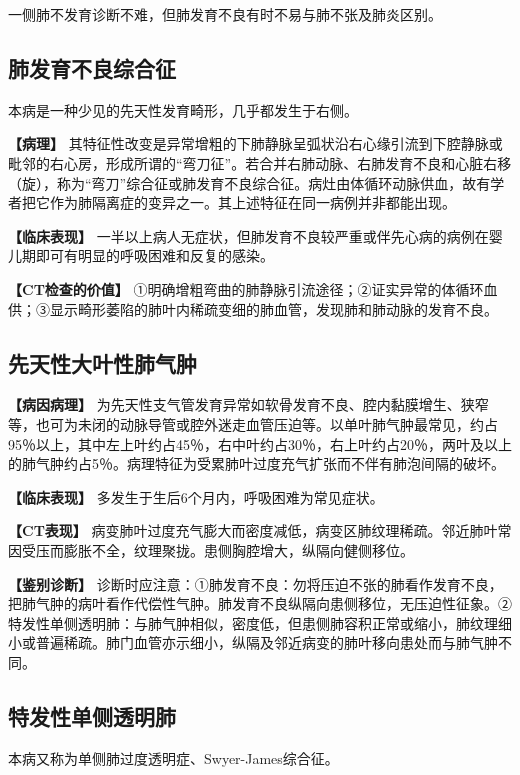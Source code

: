 一侧肺不发育诊断不难，但肺发育不良有时不易与肺不张及肺炎区别。

\subsection{肺发育不良综合征}

本病是一种少见的先天性发育畸形，几乎都发生于右侧。

\textbf{【病理】}
其特征性改变是异常增粗的下肺静脉呈弧状沿右心缘引流到下腔静脉或毗邻的右心房，形成所谓的“弯刀征”。若合并右肺动脉、右肺发育不良和心脏右移（旋），称为“弯刀”综合征或肺发育不良综合征。病灶由体循环动脉供血，故有学者把它作为肺隔离症的变异之一。其上述特征在同一病例并非都能出现。

\textbf{【临床表现】}
一半以上病人无症状，但肺发育不良较严重或伴先心病的病例在婴儿期即可有明显的呼吸困难和反复的感染。

\textbf{【CT检查的价值】}
①明确增粗弯曲的肺静脉引流途径；②证实异常的体循环血供；③显示畸形萎陷的肺叶内稀疏变细的肺血管，发现肺和肺动脉的发育不良。

\subsection{先天性大叶性肺气肿}

\textbf{【病因病理】}
为先天性支气管发育异常如软骨发育不良、腔内黏膜增生、狭窄等，也可为未闭的动脉导管或腔外迷走血管压迫等。以单叶肺气肿最常见，约占95％以上，其中左上叶约占45％，右中叶约占30％，右上叶约占20％，两叶及以上的肺气肿约占5％。病理特征为受累肺叶过度充气扩张而不伴有肺泡间隔的破坏。

\textbf{【临床表现】} 多发生于生后6个月内，呼吸困难为常见症状。

\textbf{【CT表现】}
病变肺叶过度充气膨大而密度减低，病变区肺纹理稀疏。邻近肺叶常因受压而膨胀不全，纹理聚拢。患侧胸腔增大，纵隔向健侧移位。

\textbf{【鉴别诊断】}
诊断时应注意：①肺发育不良：勿将压迫不张的肺看作发育不良，把肺气肿的病叶看作代偿性气肿。肺发育不良纵隔向患侧移位，无压迫性征象。②特发性单侧透明肺：与肺气肿相似，密度低，但患侧肺容积正常或缩小，肺纹理细小或普遍稀疏。肺门血管亦示细小，纵隔及邻近病变的肺叶移向患处而与肺气肿不同。

\subsection{特发性单侧透明肺}

本病又称为单侧肺过度透明症、Swyer-James综合征。

